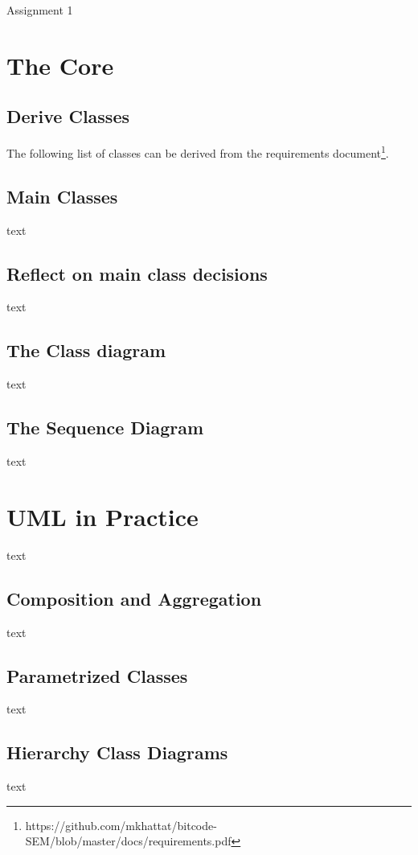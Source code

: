 \documentclass{article}
\begin{document}
\begin{titlepage}
	\Huge{Assignment 1}
\end{titlepage}


\section{The Core}

\subsection{Derive Classes}

The following list of classes can be derived from the requirements document\footnote{https://github.com/mkhattat/bitcode-SEM/blob/master/docs/requirements.pdf}.


\subsection{Main Classes}
text

\subsection{Reflect on main class decisions}
text

\subsection{The Class diagram}
text

\subsection{The Sequence Diagram}
text




\section{UML in Practice}
text

\subsection{Composition and Aggregation}
text

\subsection{Parametrized Classes}
text

\subsection{Hierarchy Class Diagrams}
text
\end{document}
